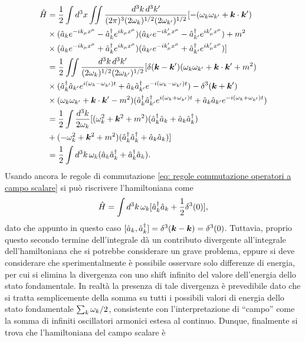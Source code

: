 \begin{equation}
    \begin{split}
        \hat{H} &= \frac{1}{2}\int d^3x\iint\frac{d^3k\,d^3k'}{(2\pi)^3(2\omega_k)^{1/2}(2\omega_{k'})^{1/2}}[-(\omega_k\omega_{k'} + \bm{k}\cdot\bm{k}') \\
        &\times (\hat{a}_ke^{-ik_\mu x^\mu} - \hat{a}^\dagger_ke^{ik_\mu x^\mu})(\hat{a}_{k'}e^{-ik'_\mu x^\mu} - \hat{a}^\dagger_{k'}e^{ik'_\mu x^\mu}) + m^2 \\
        &\times(\hat{a}_ke^{-ik_\mu x^\mu} + \hat{a}^\dagger_ke^{ik_\mu x^\mu})(\hat{a}_{k'}e^{-ik'_\mu x^\mu} + \hat{a}^\dagger_{k'}e^{ik'_\mu x^\mu})] \\
        &=\frac{1}{2}\iint\frac{d^3k\,d^3k'}{(2\omega_k)^{1/2}(2\omega_{k'})^{1/2}}[\delta(\bm{k} - \bm{k}')(\omega_k\omega_{k'} + \bm{k}\cdot\bm{k}' + m^2) \\
        &\times(\hat{a}^\dagger_k\hat{a}_{k'}e^{i(\omega_k-\omega_{k'})t} + \hat{a}_k\hat{a}^\dagger_{k'}e^{-i(\omega_k-\omega_{k'})t}) - \delta^3(\bm{k} + \bm{k}') \\
        &\times(\omega_k\omega_{k'} + \bm{k}\cdot\bm{k}' - m^2)(\hat{a}^\dagger_k\hat{a}^\dagger_{k'}e^{i(\omega_k+\omega_{k'})t} + \hat{a}_k\hat{a}_{k'}e^{-i(\omega_k+\omega_{k'})t}) \\
        &= \frac{1}{2}\int\frac{d^3k}{2\omega_k}[(\omega_k^2 + \bm{k}^2 + m^2)(\hat{a}^\dagger_k\hat{a}_k + \hat{a}_k\hat{a}^\dagger_k) \\
        &+ (-\omega_k^2 + \bm{k}^2 + m^2)(\hat{a}^\dagger_k\hat{a}^\dagger_k + \hat{a}_k\hat{a}_k)] \\
        &= \frac{1}{2}\int d^3k\,\omega_k(\hat{a}_k\hat{a}^\dagger_k + \hat{a}^\dagger_k\hat{a}_k).
    \end{split}
\end{equation}
Usando ancora le regole di commutazione \eqref{eq: regole commutazione operatori a campo scalare} si può riscrivere l'hamiltoniana come
\begin{equation}
    \hat{H} = \int d^3k\,\omega_k[\hat{a}^\dagger_k\hat{a}_k + \frac{1}{2}\delta^3(0)],
\end{equation}
dato che appunto in questo caso $[\hat{a}_k,\hat{a}^\dagger_{k}] = \delta^3(\bm{k} - \bm{k}) = \delta^3(0)$. Tuttavia, proprio questo secondo termine dell'integrale dà un contributo divergente all'integrale dell'hamiltoniana che si potrebbe considerare un grave problema, eppure si deve considerare che sperimentalmente è possibile osservare solo differenze di energia, per cui si elimina la divergenza con uno shift infinito del valore dell'energia dello stato fondamentale. In realtà la presenza di tale divergenza è prevedibile dato che si tratta semplicemente della somma su tutti i possibili valori di energia dello stato fondamentale $\sum\nolimits_k\omega_k/2$, consistente con l'interpretazione di ``campo'' come la somma di infiniti oscillatori armonici estesa al continuo. Dunque, finalmente si trova che l'hamiltoniana del campo scalare è
